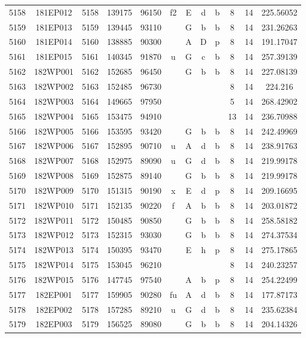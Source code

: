 \begin{tabular}{|*{12}{c|}}
5158 & 181EP012 & 5158 & 139175 & 96150 & f2 & E & d & b & 8 & 14 & 225.56052 \\ 
5159 & 181EP013 & 5159 & 139445 & 93110 &  & G & b & b & 8 & 14 & 231.26263 \\ 
5160 & 181EP014 & 5160 & 138885 & 90300 &  & A & D & p & 8 & 14 & 191.17047 \\ 
5161 & 181EP015 & 5161 & 140345 & 91870 & u & G & c & b & 8 & 14 & 257.39139 \\ 
5162 & 182WP001 & 5162 & 152685 & 96450 &  & G & b & b & 8 & 14 & 227.08139 \\ 
5163 & 182WP002 & 5163 & 152485 & 96730 &  &  &  &  & 8 & 14 & 224.216 \\ 
5164 & 182WP003 & 5164 & 149665 & 97950 &  &  &  &  & 5 & 14 & 268.42902 \\ 
5165 & 182WP004 & 5165 & 153475 & 94910 &  &  &  &  & 13 & 14 & 236.70988 \\ 
5166 & 182WP005 & 5166 & 153595 & 93420 &  & G & b & b & 8 & 14 & 242.49969 \\ 
5167 & 182WP006 & 5167 & 152895 & 90710 & u & A & d & b & 8 & 14 & 238.91763 \\ 
5168 & 182WP007 & 5168 & 152975 & 89090 & u & G & d & b & 8 & 14 & 219.99178 \\ 
5169 & 182WP008 & 5169 & 152875 & 89140 &  & G & b & b & 8 & 14 & 219.99178 \\ 
5170 & 182WP009 & 5170 & 151315 & 90190 & x & E & d & p & 8 & 14 & 209.16695 \\ 
5171 & 182WP010 & 5171 & 152135 & 90220 & f & A & b & b & 8 & 14 & 203.01872 \\ 
5172 & 182WP011 & 5172 & 150485 & 90850 &  & G & b & b & 8 & 14 & 258.58182 \\ 
5173 & 182WP012 & 5173 & 152315 & 93030 &  & G & b & b & 8 & 14 & 274.37534 \\ 
5174 & 182WP013 & 5174 & 150395 & 93470 &  & E & h & p & 8 & 14 & 275.17865 \\ 
5175 & 182WP014 & 5175 & 153045 & 96210 &  &  &  &  & 8 & 14 & 240.23257 \\ 
5176 & 182WP015 & 5176 & 147745 & 97540 &  & A & b & p & 8 & 14 & 254.22499 \\ 
5177 & 182EP001 & 5177 & 159905 & 90280 & fu & A & d & b & 8 & 14 & 177.87173 \\ 
5178 & 182EP002 & 5178 & 157285 & 89210 & u & G & d & b & 8 & 14 & 235.62384 \\ 
5179 & 182EP003 & 5179 & 156525 & 89080 &  & G & b & b & 8 & 14 & 204.14326 \\ 

\end{tabular}
